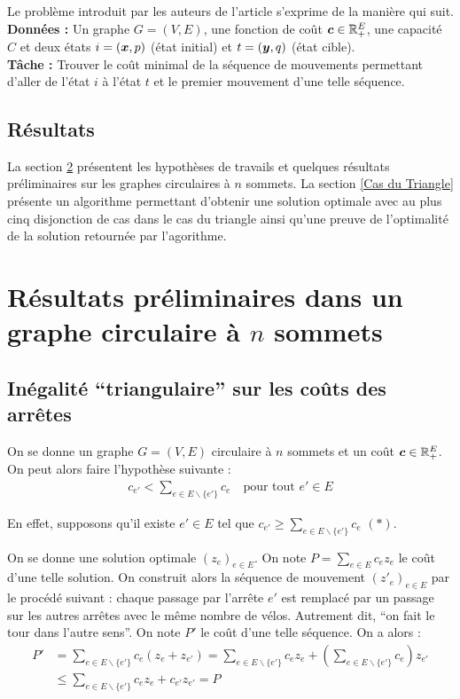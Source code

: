 \documentclass[twoside,11pt,openany,a4paper]{rapport}
\begin{document}
Le problème introduit par les auteurs de l'article \cite{Benchimol2011} s'exprime de la manière qui suit.
\\
\textbf{Données :} Un graphe $G=(V,E)$, une fonction de coût $\boldsymbol{c} \in \mathbb{R}^E_+$, une capacité $C$ et deux états $i=(\boldsymbol{x},p)$ (état initial) et $t=(\boldsymbol{y},q)$ (état cible).
\\
\textbf{Tâche :} Trouver le coût minimal de la séquence de mouvements permettant d'aller de l'état $i$ à l'état $t$ et le premier mouvement d'une telle séquence.

\section{Résultats}

La section \ref{Résultats préliminaires} présentent les hypothèses de travails et quelques résultats préliminaires sur les graphes circulaires à $n$ sommets. La section \ref{Cas du Triangle} présente un algorithme permettant d'obtenir une solution optimale avec au plus cinq disjonction de cas dans le cas du triangle ainsi qu'une preuve de l'optimalité de la solution retournée par l'agorithme.

\chapter{Résultats préliminaires dans un graphe circulaire à $n$ sommets}
\label{Résultats préliminaires}

\section{Inégalité ``triangulaire'' sur les coûts des arrêtes}
\label{sec: Inégalité triangulaire}

On se donne un graphe $G=(V,E)$ circulaire à $n$ sommets et un coût $\boldsymbol{c} \in \mathbb{R}^E_+$. On peut alors faire l'hypothèse suivante :
\begin{gather}\label{Inégalité Triangulaire}
  c_{e'}<\sum_{e \in E \backslash \{e'\}} c_e \quad \text{pour tout } e' \in E
\end{gather}

En effet, supposons qu'il existe $e' \in E$ tel que $c_{e'} \ge \sum_{e \in E \backslash \{e'\}} c_e$ $(*)$.

On se donne une solution optimale $(z_e)_{e \in E}$. On note $P = \sum_{e \in E} c_ez_e$ le coût d'une telle solution. On construit alors la séquence de mouvement $(z'_e)_{e \in E}$ par le procédé suivant : chaque passage par l'arrête $e'$ est remplacé par un passage sur les autres arrêtes avec le même nombre de vélos. Autrement dit, ``on fait le tour dans l'autre sens''. On note $P'$ le coût d'une telle séquence. On a alors :
\begin{align*}
  P' &= \sum_{e \in E \backslash \{e'\}} c_e (z_e + z_{e'}) = \sum_{e \in E \backslash \{e'\}} c_ez_e + \left(\sum_{e \in E \backslash \{e'\}} c_{e}\right)z_{e'} \\
     &\le \sum_{e \in E \backslash \{e'\}} c_ez_e + c_{e'}z_{e'} = P
\end{align*}
\end{document}
